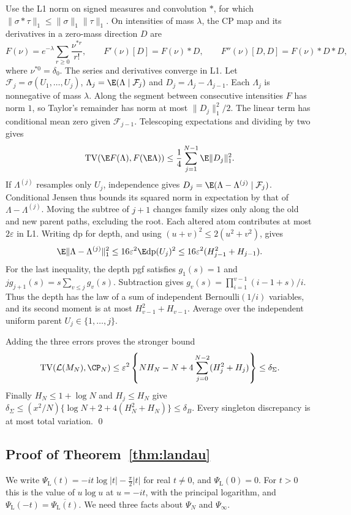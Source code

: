 Use the L1 norm on signed measures and convolution $*$, for which
$\|\sigma*\tau\|_1\le\|\sigma\|_1\|\tau\|_1$. On intensities of mass
$\lambda$, the CP map and its derivatives in a zero-mass direction $D$ are
\[
 F(\nu)=e^{-\lambda}\sum_{r\ge0}\frac{\nu^{*r}}{r!},\qquad
 F'(\nu)[D]=F(\nu)*D,\qquad F''(\nu)[D,D]=F(\nu)*D*D,
\]
where $\nu^{*0}=\delta_0$. The series and derivatives converge in L1.
Let $\mathcal F_j=\sigma(U_1,\ldots,U_j)$,
$\Lambda_j=\E(\Lambda\mid\mathcal F_j)$ and
$D_j=\Lambda_j-\Lambda_{j-1}$. Each $\Lambda_j$ is nonnegative of mass
$\lambda$. Along the segment between consecutive intensities $F$ has norm
$1$, so Taylor's remainder has norm at most $\|D_j\|_1^2/2$.
The linear term has conditional mean zero given $\mathcal F_{j-1}$.
Telescoping expectations and dividing by two gives
\[
 \operatorname{TV}(\E F(\Lambda),F(\E\Lambda))
 \le\frac14\sum_{j=1}^{N-1}\E\|D_j\|_1^2.
\]
If $\Lambda^{(j)}$ resamples only $U_j$, independence gives
$D_j=\E(\Lambda-\Lambda^{(j)}\mid\mathcal F_j)$.
Conditional Jensen thus bounds its squared norm in expectation by that of
$\Lambda-\Lambda^{(j)}$. Moving the subtree of $j+1$ changes family sizes
only along the old and new parent paths, excluding the root. Each altered
atom contributes at most $2\varepsilon$ in L1. Writing $\mathrm{dp}$ for
depth, and using $(u+v)^2\le2(u^2+v^2)$, gives
\[
 \E\|\Lambda-\Lambda^{(j)}\|_1^2
 \le16\varepsilon^2\E\mathrm{dp}(U_j)^2
 \le16\varepsilon^2(H_{j-1}^2+H_{j-1}).
\]
For the last inequality, the depth pgf satisfies $g_1(s)=1$ and
$j g_{j+1}(s)=s\sum_{v\le j}g_v(s)$. Subtraction gives
$g_v(s)=\prod_{i=1}^{v-1}(i-1+s)/i$. Thus the depth has the law of a sum
of independent Bernoulli$(1/i)$ variables, and its second moment is at
most $H_{v-1}^2+H_{v-1}$. Average over the independent uniform parent
$U_j\in\{1,\ldots,j\}$.

Adding the three errors proves the stronger bound
\[
 \operatorname{TV}(\mathcal L(M_N),\CP_N)
 \le\varepsilon^2\left\{NH_N-N+
       4\sum_{j=0}^{N-2}(H_j^2+H_j)\right\}
 \le\delta_\Sigma.
\]
Finally $H_N\le1+\log N$ and $H_j\le H_N$ give
$\delta_\Sigma\le(x^2/N)\{\log N+2+4(H_N^2+H_N)\}\le\delta_B$.
Every singleton discrepancy is at most total variation. \qed

\subsection{Proof of Theorem~\ref{thm:landau}}\label{app:bulk-landau}

We write $\Psi_{\mathrm L}(t)=-it\log\lvert t\rvert-\frac\pi2\lvert t\rvert$ for real
$t\ne0$, and $\Psi_{\mathrm L}(0)=0$. For $t>0$ this is the value of $u\log u$ at $u=-it$,
with the principal logarithm, and $\Psi_{\mathrm L}(-t)=\overline{\Psi_{\mathrm L}(t)}$. We need three
facts about $\Psi_N$ and $\Psi_\infty$.

